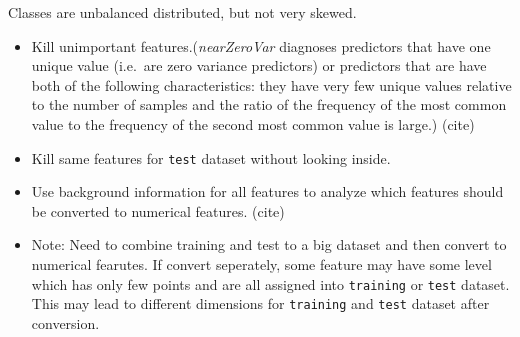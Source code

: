 \documentclass[]{article}
\newenvironment{Shaded}{\begin{snugshade}}{\end{snugshade}}
\newcommand{\KeywordTok}[1]{\textcolor[rgb]{0.13,0.29,0.53}{\textbf{{#1}}}}
\newcommand{\DataTypeTok}[1]{\textcolor[rgb]{0.13,0.29,0.53}{{#1}}}
\newcommand{\DecValTok}[1]{\textcolor[rgb]{0.00,0.00,0.81}{{#1}}}
\newcommand{\StringTok}[1]{\textcolor[rgb]{0.31,0.60,0.02}{{#1}}}
\newcommand{\OtherTok}[1]{\textcolor[rgb]{0.56,0.35,0.01}{{#1}}}
\newcommand{\NormalTok}[1]{{#1}}
\begin{document}
Classes are unbalanced distributed, but not very skewed.

\begin{itemize}
\itemsep1pt\parskip0pt
\item
  Kill unimportant features.(\emph{nearZeroVar} diagnoses predictors
  that have one unique value (i.e.~are zero variance predictors) or
  predictors that are have both of the following characteristics: they
  have very few unique values relative to the number of samples and the
  ratio of the frequency of the most common value to the frequency of
  the second most common value is large.) (cite)
\end{itemize}

\begin{Shaded}
\end{Shaded}

\begin{itemize}
\itemsep1pt\parskip0pt
\item
  Kill same features for \texttt{test} dataset without looking inside.
\end{itemize}

\begin{Shaded}
\end{Shaded}

\begin{itemize}
\itemsep1pt\parskip0pt
\item
  Use background information for all features to analyze which features
  should be converted to numerical features. (cite)
\item
  Note: Need to combine training and test to a big dataset and then
  convert to numerical fearutes. If convert seperately, some feature may
  have some level which has only few points and are all assigned into
  \texttt{training} or \texttt{test} dataset. This may lead to different
  dimensions for \texttt{training} and \texttt{test} dataset after
  conversion.
\end{itemize}
\end{document}
